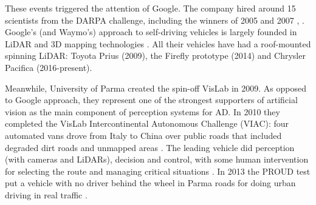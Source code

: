 %

These events triggered the attention of Google. 
The company hired around 15 scientists from the DARPA challenge, 
including the winners of 2005 and 2007 \cite{Montemerlo2008}, 
\cite{Levinson2011}. Google's (and Waymo's) approach to self-driving vehicles
is largely founded in LiDAR and 3D mapping technologies \cite{Chapell2016}. 
All their vehicles have had a roof-mounted spinning LiDAR: Toyota Prius (2009),
the Firefly prototype (2014) and Chrysler Pacifica (2016-present).

Meanwhile, University of Parma created the spin-off VisLab in 2009. 
As opposed to Google approach, they represent one of the strongest supporters
of artificial vision as the main component of perception systems for AD. 
In 2010 they completed the VisLab Intercontinental Autonomous 
Challenge (VIAC): four automated vans drove from Italy to China over public 
roads that included degraded dirt roads and unmapped areas \cite{Bertozzi2011}.
The leading vehicle did perception (with cameras and LiDARs), decision and 
control, with some human intervention for selecting the route and managing 
critical situations \cite{Broggi2012}. 
In 2013 the PROUD test put a vehicle with no driver behind the wheel in Parma 
roads for doing urban driving in real traffic \cite{Broggi2013}. 
 
